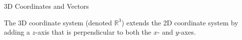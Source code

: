 3D Coordinates and Vectors

The 3D coordinate system (denoted $\mathbb{R}^3$) extends the 2D coordinate system by adding a $z$-axis that is perpendicular to both the $x$- and $y$-axes. 
